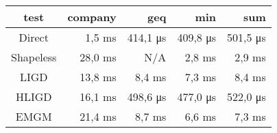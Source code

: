 \begin{tabular}{c|r|r|r|r}
\bf{test}  & \bf{company}    & \bf{geq}        & \bf{min}        & \bf{sum}       \\
\hline
Direct     &          1,5 ms &        414,1 μs &        409,8 μs &        501,5 μs\\
Shapeless  &         28,0 ms &             N/A &          2,8 ms &          2,9 ms\\
LIGD       &         13,8 ms &          8,4 ms &          7,3 ms &          8,4 ms\\
HLIGD      &         16,1 ms &        498,6 μs &        477,0 μs &        522,0 μs\\
EMGM       &         21,4 ms &          8,7 ms &          6,6 ms &          7,3 ms\\
\end{tabular}
